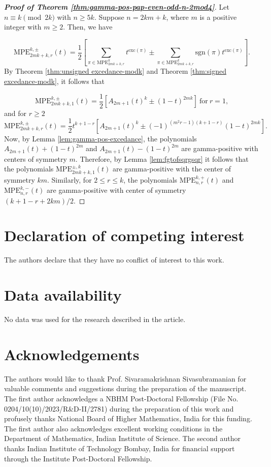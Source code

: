\documentclass[12pt]{article}
\newcommand{\MPE}{\mathrm{MPE}}
\newcommand{\exc}{\mathrm{exc}}
\newcommand{\sgn}{\mathrm{sgn}}
\begin{document}
\begin{proof}[\textbf{Proof of Theorem \ref{thm:gamma-pos-pap-even-odd-n-2mod4}}]
Let $n \equiv k \pmod {2k}$ with $n \geq 5k$. Suppose $n=2km+k$,  where $m$ is a positive integer with $m\geq 2$. Then, we have

\[\MPE_{2mk+k, r}^{k,\pm}(t) = \frac{1}{2} \left[ \sum_{\pi \in \MPE_{2mk+k,r}^{k}  }  t^{\exc(\pi)} \pm \sum_{\pi \in \MPE_{2mk+k,r}^{k}  }  \sgn(\pi) t^{\exc(\pi)}\right] .\]
By Theorem \ref{thm:unsigned excedance-modk} and Theorem \ref{thm:signed excedance-modk}, it follows that

\[ \MPE_{2mk+k,1}^{k,\pm}(t) = \frac{1}{2} \left[ A_{2m+1}(t)^k \pm  (1-t)^{2mk}  \right] ~ \text{for} ~ r=1, \]
and for $r \geq 2$
\[ \MPE_{2mk+k,r}^{k,\pm}(t) = \frac{1}{2} t^{k+1-r} \left[ A_{2m+1}(t)^k \pm 
(-1)^{(m^2r-1)(k+1-r)}   (1-t)^{2mk}  \right]. \] 
Now, by Lemma \ref{lem:gamma-pos-excedance}, the polynomials $A_{2m+1}(t)+(1-t)^{2m}$ and $A_{2m+1}(t)-(1-t)^{2m}$ are gamma-positive with centers of symmetry 
$m$. Therefore, by Lemma \ref{lem:fgtofsqrgsqr} it follows that the polynomials $\MPE_{2mk+k,1}^{\pm,k}(t)$ are gamma-positive with the center of symmetry $km$. Similarly, for $2 \leq r \leq k$, the polynomials $\MPE_{n,r}^{k,+}(t)$ and $\MPE_{n,r}^{k,-}(t)$  are gamma-positive with center of symmetry  $(k+1-r+2km)/2.$ 
\end{proof} 

	 
\section*{Declaration of competing interest}	 
	
The authors declare that they have no conflict of interest to this work.
	
\section*{Data availability}	
	
No data was used for the research described in the article.

\section*{Acknowledgements}
The authors would like to thank Prof. Sivaramakrishnan Sivasubramanian for 
valuable comments and suggestions during the preparation of the manuscript. The first author acknowledges a NBHM Post-Doctoral Fellowship (File No. 0204/10(10)/2023/R{\&}D-II/2781) during the preparation of this work and profusely thanks National Board of Higher Mathematics, India for this funding. The first author also acknowledges excellent working conditions in the Department of Mathematics, Indian Institute
of Science. The second author thanks Indian Institute of Technology Bombay, India for financial support through the Institute Post-Doctoral Fellowship.
\end{document}
